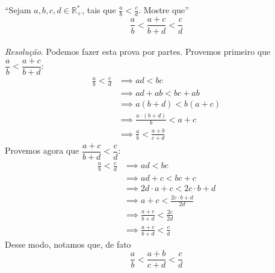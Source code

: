 \enquote{Sejam $a,b,c,d \in \mathbb{R}_+^*$, tais que $\frac{a}{b} < \frac{c}{d}$. Mostre que}
\begin{displaymath}
    \frac{a}{b} < \frac{a + c}{b + d} < \frac{c}{d}
\end{displaymath}
\\ \emph{Resolução}. Podemos fazer esta prova por partes. Provemos primeiro que $\dfrac{a}{b} < \dfrac{a + c}{b + d}$:
\begin{align*}
\frac{a}{b} < \frac{c}{d} & \implies ad < bc \\ & \implies
    ad + ab < bc + ab \\ & \implies
    a(b + d) < b(a + c) \\ & \implies
    \frac{a\cdot (b + d)}{b} < a + c \\ & \implies
    \frac{a}{b} < \frac{a + b}{c + d}
\end{align*}
Provemos agora que $\dfrac{a + c}{b + d} < \dfrac{c}{d}$:
\begin{align*}
    \frac{a}{b} < \frac{c}{d} & \implies ad < bc \\ & \implies
    ad + c < bc + c \\ & \implies
    2d \cdot a + c < 2c \cdot b + d \\ & \implies
    a + c < \frac{2c \cdot b + d}{2d} \\ & \implies
    \frac{a + c}{b + d} < \frac{2c}{2d} \\ & \implies
    \frac{a + c}{b + d} < \frac{c}{d}
\end{align*}
Desse modo, notamos que, de fato
\begin{displaymath}
    \frac{a}{b} < \frac{a + b}{c + d} < \frac{c}{d}
\end{displaymath}